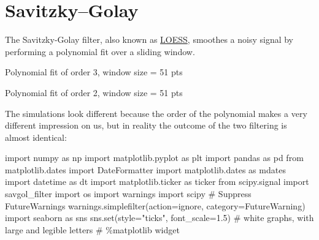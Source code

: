 \documentclass[
  letterpaper,
  DIV=11,
  numbers=noendperiod,
  oneside]{scrreprt}
\newenvironment{Shaded}{\begin{snugshade}}{\end{snugshade}}
\newcommand{\BuiltInTok}[1]{\textcolor[rgb]{0.00,0.23,0.31}{#1}}
\newcommand{\CommentTok}[1]{\textcolor[rgb]{0.37,0.37,0.37}{#1}}
\newcommand{\FloatTok}[1]{\textcolor[rgb]{0.68,0.00,0.00}{#1}}
\newcommand{\ImportTok}[1]{\textcolor[rgb]{0.00,0.46,0.62}{#1}}
\newcommand{\NormalTok}[1]{\textcolor[rgb]{0.00,0.23,0.31}{#1}}
\newcommand{\OperatorTok}[1]{\textcolor[rgb]{0.37,0.37,0.37}{#1}}
\newcommand{\PreprocessorTok}[1]{\textcolor[rgb]{0.68,0.00,0.00}{#1}}
\newcommand{\StringTok}[1]{\textcolor[rgb]{0.13,0.47,0.30}{#1}}
\begin{document}
\hypertarget{savitzkygolay}{%
\chapter{Savitzky--Golay}\label{savitzkygolay}}

The Savitzky-Golay filter, also known as
\href{https://en.wikipedia.org/wiki/Local_regression}{LOESS}, smoothes a
noisy signal by performing a polynomial fit over a sliding window.

Polynomial fit of order 3, window size = 51 pts

Polynomial fit of order 2, window size = 51 pts

The simulations look different because the order of the polynomial makes
a very different impression on us, but in reality the outcome of the two
filtering is almost identical:

\begin{Shaded}
\begin{Highlighting}[]
\ImportTok{import}\NormalTok{ numpy }\ImportTok{as}\NormalTok{ np}
\ImportTok{import}\NormalTok{ matplotlib.pyplot }\ImportTok{as}\NormalTok{ plt}
\ImportTok{import}\NormalTok{ pandas }\ImportTok{as}\NormalTok{ pd}
\ImportTok{from}\NormalTok{ matplotlib.dates }\ImportTok{import}\NormalTok{ DateFormatter}
\ImportTok{import}\NormalTok{ matplotlib.dates }\ImportTok{as}\NormalTok{ mdates}
\ImportTok{import}\NormalTok{ datetime }\ImportTok{as}\NormalTok{ dt}
\ImportTok{import}\NormalTok{ matplotlib.ticker }\ImportTok{as}\NormalTok{ ticker}
\ImportTok{from}\NormalTok{ scipy.signal }\ImportTok{import}\NormalTok{ savgol\_filter}
\ImportTok{import}\NormalTok{ os}
\ImportTok{import}\NormalTok{ warnings}
\ImportTok{import}\NormalTok{ scipy}
\CommentTok{\# Suppress FutureWarnings}
\NormalTok{warnings.simplefilter(action}\OperatorTok{=}\StringTok{\textquotesingle{}ignore\textquotesingle{}}\NormalTok{, category}\OperatorTok{=}\PreprocessorTok{FutureWarning}\NormalTok{)}
\ImportTok{import}\NormalTok{ seaborn }\ImportTok{as}\NormalTok{ sns}
\NormalTok{sns.}\BuiltInTok{set}\NormalTok{(style}\OperatorTok{=}\StringTok{"ticks"}\NormalTok{, font\_scale}\OperatorTok{=}\FloatTok{1.5}\NormalTok{)  }\CommentTok{\# white graphs, with large and legible letters}
\CommentTok{\# \%matplotlib widget}
\end{Highlighting}
\end{Shaded}
\end{document}
